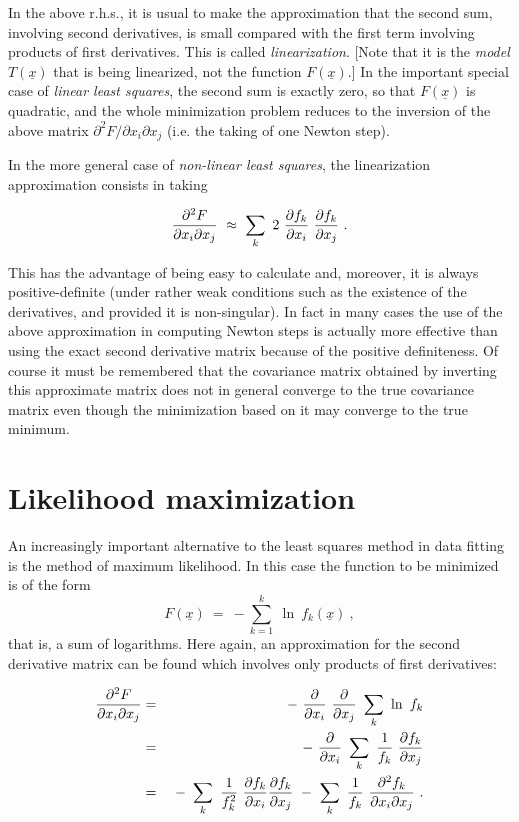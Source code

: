 In the above r.h.s., it is usual to make the approximation that the
second sum, involving second derivatives, is small compared with the
first term involving products of first derivatives.  This is called
{\em linearization}.  [Note that it is the {\em model}  $T({\underline{x}})$ that is being
linearized, not the function $F({\underline{x}}).$]  In the important special case of {\em linear
least squares}, the second sum is exactly zero, so that $F({\underline{x}})$ is quadratic, and
the whole minimization problem reduces to the inversion of the above
matrix $\partial^2F/\partial x_i \partial x_j$ (i.e. the taking of one Newton step).
 
 
     In the more general case of {\em non-linear least squares}, the
linearization approximation consists in taking
 
$${\partial^2F\over \partial x_i\partial x_j}~\approx~\sum_k~2~{\partial f_k\over \partial x_i}
~{\partial f_k\over \partial x_j}~.$$
 
This has the advantage of being easy to calculate and, moreover, it is
always positive-definite (under rather weak conditions such as the
existence of the derivatives, and provided it is non-singular). In fact
in many cases the use of the above approximation in computing Newton
steps is actually more effective than using the exact second derivative
matrix because of the positive definiteness.  Of course it must be
remembered that the covariance matrix obtained by inverting this
approximate
matrix does not in general converge to the true covariance matrix
even though the minimization  based on it may converge to the true
minimum.
 
\section{Likelihood maximization}
 
     An increasingly important alternative to the least squares method
in data fitting is the method of maximum likelihood.  In this case the
function to be minimized is of the form
 $$F({\underline{x}})~=~-\sum^{k}_{k=1}~\ln~f_k({\underline{x}})~,$$
that is, a sum of logarithms.  Here again, an approximation for the
second derivative matrix can be found which involves only products of
first derivatives:
 
 \begin{eqnarray}
{\partial^2F\over \partial x_i\partial x_j}&=&-~{\partial\over \partial x_i}~{\partial\over \partial
x_j}~\sum_k~\ln~f_k\nonumber\\
&=&-~{\partial\over \partial x_i}~\sum_k~{1\over f_k}~{\partial f_k\over \partial x_j}\nonumber\\
&=&~-~\sum_k~{1\over f^{2}_k}~{\partial f_k\over \partial x_i}{\partial f_k\over \partial
x_j}~-~\sum_k~{1\over f_k}~{\partial^2f_k\over \partial x_i\partial x_j}~.\nonumber
\end{eqnarray}
 
